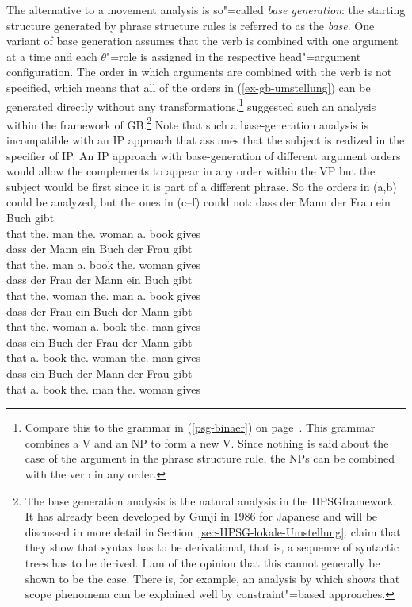The alternative to a movement analysis is so"=called \emph{base generation}: the starting structure generated by phrase structure
rules is referred to as the \emph{base}. One variant of base generation assumes that the verb is
combined with one argument at a time and each $\theta$"=role is assigned in the respective head"=argument configuration. The order in which
arguments are combined with the verb is not specified, which means that all of the orders in (\ref{ex-gb-umstellung}) can be
generated directly without any transformations.\footnote{%
 Compare this to the grammar in (\ref{psg-binaer}) on page~\pageref{psg-binaer}. This grammar
 combines a V and an NP to form a new V. Since nothing is said about the case of the argument in the
 phrase structure rule, the NPs can be combined with the verb in any order.
} \citet{Fanselow2001a} suggested such an analysis within the framework of GB.\footnote{%
	The base generation analysis is the natural analysis in the HPSG\indexhpsg framework. It has already been developed by Gunji\nocite{Gunji86a}
	in 1986 for Japanese and will be discussed in more detail in Section~\ref{sec-HPSG-lokale-Umstellung}. \citet[--314]{SE2002a}
	claim that they show that syntax has to be derivational, that is, a sequence of syntactic
        trees has to be derived. I am of the opinion that this cannot generally be shown to be the
        case. There is, for example, an analysis by \citet{Kiss2001a} which shows that scope
        phenomena can be explained well by constraint"=based approaches.
} Note that such a base-generation analysis is incompatible with an IP approach that assumes that
the subject is realized in the specifier of IP. An IP approach with base-generation of different
argument orders would allow the complements to appear in any order within the VP but the subject
would be first since it is part of a different phrase. So the orders in (a,b) could be
analyzed, but the ones in (c--f) could not:
\eal
\ex 
\gll dass der       Mann der       Frau  ein Buch gibt\\
     that the.\nom{} man  the.\dat{} woman a.\acc{} book gives\\
\ex
\gll dass der       Mann ein Buch der       Frau gibt\\
     that the.\nom{} man  a.\acc{} book   the.\dat{} woman gives\\
\ex
\gll dass der       Frau  der Mann ein Buch gibt\\
     that the.\dat{} woman the.\nom{} man a.\acc{} book gives\\
\ex 
\gll dass der Frau ein Buch der Mann gibt\\
     that the.\dat{} woman a.\acc{} book the.\nom{} man gives\\
\ex
\gll dass ein Buch der Frau der Mann gibt\\
     that a.\acc{}   book the.\dat{} woman the.\nom{} man gives\\
\ex
\gll dass ein Buch der Mann der Frau gibt\\
     that a.\acc{}   book the.\nom{} man the.\dat{} woman gives\\
\zl

